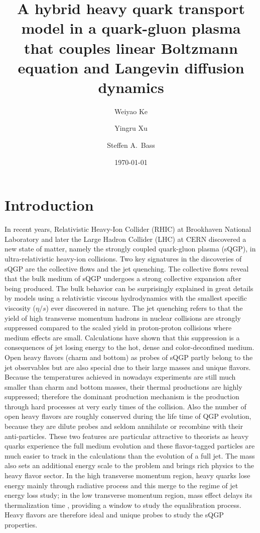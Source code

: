 \documentclass[aps, prc, reprint, amsmath, groupedaddress, nofootinbib]{revtex4-1}
\begin{document}
\title{A hybrid heavy quark transport model in a quark-gluon plasma that couples linear Boltzmann equation and Langevin diffusion dynamics}
\author{Weiyao Ke}
\author{Yingru Xu}
\author{Steffen A.\ Bass}
\date{\today}
\maketitle

\section{Introduction}
In recent years, Relativistic Heavy-Ion Collider (RHIC) at Brookhaven National Laboratory and later the Large Hadron Collider (LHC) at CERN discovered a new state of matter, namely the strongly coupled quark-gluon plasma (sQGP), in ultra-relativistic heavy-ion collisions.
Two key signatures in the discoveries of sQGP are the collective flows and the jet quenching.
The collective flows reveal that the bulk medium of sQGP undergoes a strong collective expansion after being produced.
The bulk behavior can be surprisingly explained in great details by models using a relativistic viscous hydrodynamics with the smallest specific viscosity ($\eta/s$) ever discovered in nature.
The jet quenching refers to that the yield of high transverse momentum hadrons in nuclear collisions are strongly suppressed compared to the scaled yield in proton-proton collisions where medium effects are small.
Calculations have shown that this suppression is a consequences of jet losing energy to the hot, dense and color-deconfined medium. 
Open heavy flavors (charm and bottom) as probes of sQGP partly belong to the jet observables but are also special due to their large masses and unique flavors.
Because the temperatures achieved in nowadays experiments are still much smaller than charm and bottom masses, their thermal productions are highly suppressed; 
therefore the dominant production mechanism is the production through hard processes at very early times of the collision.
Also the number of open heavy flavors are roughly conserved during the life time of QGP evolution, because they are dilute probes and seldom annihilate or recombine with their anti-particles.
These two features are particular attractive to theorists as heavy quarks experience the full medium evolution and these flavor-tagged particles are much easier to track in the calculations than the evolution of a full jet.
The mass also sets an additional energy scale to the problem and brings rich physics to the heavy flavor sector.
In the high transverse momentum region, heavy quarks lose energy mainly through radiative process and this merge to the regime of jet energy loss study;
in the low transverse momentum region, mass effect delays its thermalization time \cite{Moore:2004tg}, providing a window to study the equalibration process.
Heavy flavors are therefore ideal and unique probes to study the sQGP properties.
\end{document}
